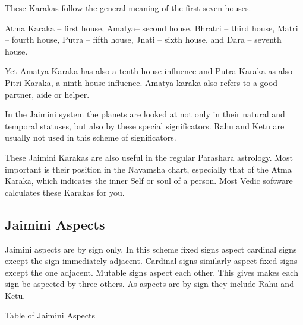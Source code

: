 These Karakas follow the general meaning of the first seven houses.

 

Atma Karaka – first house, Amatya– second house, Bhratri – third house, Matri – fourth house, Putra – fifth house, Jnati – sixth house, and Dara – seventh house.
 

Yet Amatya Karaka has also a tenth house influence and Putra Karaka as also Pitri Karaka, a ninth house influence. Amatya karaka also refers to a good partner, aide or helper.

 

In the Jaimini system the planets are looked at not only in their natural and temporal statuses, but also by these special significators. Rahu and Ketu are usually not used in this scheme of significators.

 

These Jaimini Karakas are also useful in the regular Parashara astrology. Most important is their position in the Navamsha chart, especially that of the Atma Karaka, which indicates the inner Self or soul of a person. Most Vedic software calculates these Karakas for you.

 



 

\subsection{Jaimini Aspects}
 

Jaimini aspects are by sign only. In this scheme fixed signs aspect cardinal signs except the sign immediately adjacent. Cardinal signs similarly aspect fixed signs except the one adjacent. Mutable signs aspect each other. This gives makes each sign be aspected by three others. As aspects are by sign they include Rahu and Ketu.

 

Table of Jaimini Aspects

